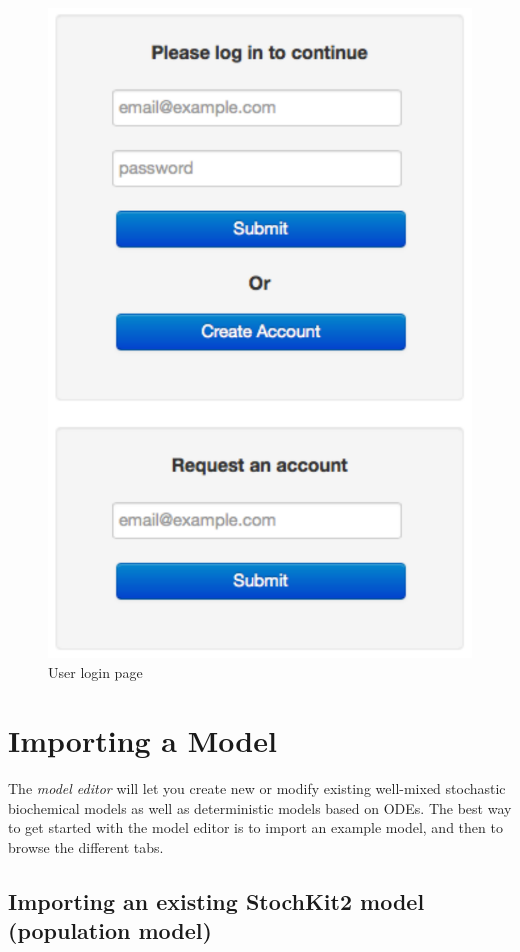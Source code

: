 \begin{figure}[!htb]
\centering
\includegraphics[scale=0.64]{T1/user-login.pdf}
\caption{User login page}
\label{fig:1}
\end{figure}

\section{\label{sec:imp} Importing a Model}
The \textit{model editor} will let you create new or modify existing well-mixed stochastic biochemical models as well as deterministic models based on ODEs. The best way to get started with the model editor is to import an example model, and then to browse the different tabs.

\subsection{Importing an existing StochKit2 model (population model)}

